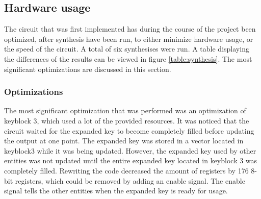 \subsection{Hardware usage}
The circuit that was first implemented has during the course of the 
project been optimized, after synthesis have been run, to either 
minimize hardware usage, or the speed of the circuit. A total of six 
synthesises were run. A table displaying the differences of the results 
can be viewed in figure \ref{table:synthesis}.
The most significant optimizations are discussed in this section. 

\subsubsection{Optimizations}
The most significant optimization that was performed was an 
optimization of keyblock 3, which used a lot of the provided resources.
It was noticed that the circuit waited for the expanded key to become 
completely filled before updating the output at one point. The expanded 
key was stored in a vector located in keyblock3 while it was being 
updated. However, the expanded key used by other entities was not 
updated until the entire expanded key located in keyblock 3 was 
completely filled. Rewriting the code decreased the amount of registers 
by 176 8-bit registers, which could be removed by adding an enable 
signal. The enable signal tells the other entities when the expanded 
key is ready for usage.


